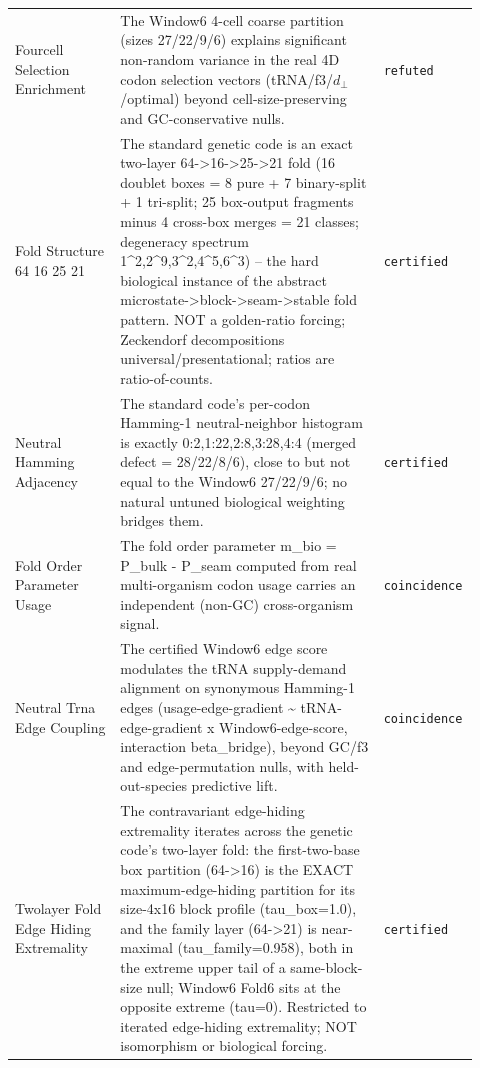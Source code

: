\begin{longtable}{>{\raggedright\arraybackslash}p{0.22\linewidth}>{\raggedright\arraybackslash}p{0.55\linewidth}>{\raggedright\arraybackslash}p{0.15\linewidth}}
Fourcell Selection Enrichment & The Window6 4-cell coarse partition (sizes 27/22/9/6) explains significant non-random variance in the real 4D codon selection vectors (tRNA/f3/$d_{\perp}$/optimal) beyond cell-size-preserving and GC-conservative nulls. & \texttt{refuted} \\
Fold Structure 64 16 25 21 & The standard genetic code is an exact two-layer 64->16->25->21 fold (16 doublet boxes = 8 pure + 7 binary-split + 1 tri-split; 25 box-output fragments minus 4 cross-box merges = 21 classes; degeneracy spectrum 1\textasciicircum{}2,2\textasciicircum{}9,3\textasciicircum{}2,4\textasciicircum{}5,6\textasciicircum{}3) -- the hard biological instance of the abstract microstate->block->seam->stable fold pattern. NOT a golden-ratio forcing; Zeckendorf decompositions universal/presentational; ratios are ratio-of-counts. & \texttt{certified} \\
Neutral Hamming Adjacency & The standard code's per-codon Hamming-1 neutral-neighbor histogram is exactly 0:2,1:22,2:8,3:28,4:4 (merged defect = 28/22/8/6), close to but not equal to the Window6 27/22/9/6; no natural untuned biological weighting bridges them. & \texttt{certified} \\
Fold Order Parameter Usage & The fold order parameter m\_bio = P\_bulk - P\_seam computed from real multi-organism codon usage carries an independent (non-GC) cross-organism signal. & \texttt{coincidence} \\
Neutral Trna Edge Coupling & The certified Window6 edge score modulates the tRNA supply-demand alignment on synonymous Hamming-1 edges (usage-edge-gradient \textasciitilde{} tRNA-edge-gradient x Window6-edge-score, interaction beta\_bridge), beyond GC/f3 and edge-permutation nulls, with held-out-species predictive lift. & \texttt{coincidence} \\
Twolayer Fold Edge Hiding Extremality & The contravariant edge-hiding extremality iterates across the genetic code's two-layer fold: the first-two-base box partition (64->16) is the EXACT maximum-edge-hiding partition for its size-4x16 block profile (tau\_box=1.0), and the family layer (64->21) is near-maximal (tau\_family=0.958), both in the extreme upper tail of a same-block-size null; Window6 Fold6 sits at the opposite extreme (tau=0). Restricted to iterated edge-hiding extremality; NOT isomorphism or biological forcing. & \texttt{certified} \\

\end{longtable}
